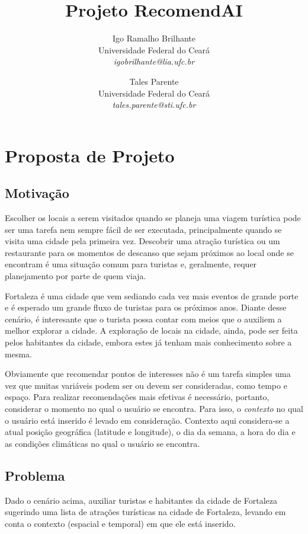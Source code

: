 \documentclass[10pt,a4paper,twocolumn]{article}
\author{Igo Ramalho Brilhante \\ \small{Universidade Federal do Ceará} \\  \small{\textit{igobrilhante@lia.ufc.br}} \and Tales Parente \\  \small{Universidade Federal do Ceará} \\ \small{\textit{tales.parente@sti.ufc.br}} }
\title{Projeto RecomendAI}
\begin{document}
\maketitle

\section*{Proposta de Projeto}

\subsection*{Motivação}
Escolher os locais a serem visitados quando se planeja uma viagem turística pode ser uma tarefa nem sempre fácil de ser executada, principalmente quando se visita uma cidade pela primeira vez. Descobrir uma atração turística ou um restaurante para os momentos de descanso que sejam próximos ao local onde se encontram é uma situação comum para turistas e, geralmente, requer planejamento por parte de quem viaja.

Fortaleza é uma cidade que vem sediando cada vez mais eventos de grande porte e é esperado um grande fluxo de turistas para os próximos anos. Diante desse cenário, é interesante que o turista possa contar com meios que o auxiliem a melhor explorar a cidade. A exploração de locais na cidade, ainda, pode ser feita pelos habitantes da cidade, embora estes já tenham mais conhecimento sobre a mesma.

Obviamente que recomendar pontos de interesses não é um tarefa simples uma vez que muitas variáveis podem ser ou devem ser consideradas, como tempo e espaço. Para realizar recomendações mais efetivas é necessário, portanto, considerar o momento no qual o usuário se encontra. Para isso, o \emph{contexto} no qual o usuário está inserido é levado em consideração. Contexto aqui considera-se a atual posição geográfica (latitude e longitude), o dia da semana, a hora do dia e as condições climáticas no qual o usuário se encontra.

\subsection*{Problema}
Dado o cenário acima, auxiliar turistas e habitantes da cidade de Fortaleza sugerindo uma lista de atrações turísticas na cidade de Fortaleza, levando em conta o contexto (espacial e temporal) em que ele está inserido.
	
\end{document}
